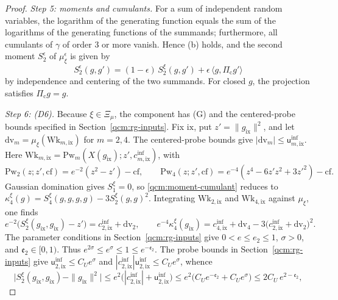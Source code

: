 \documentclass[11pt,letterpaper,reqno]{amsart}
\theoremstyle{definition}
\begin{document}
\begin{proof}
\emph{Step 5: moments and cumulants.}
For a sum of independent random variables, the logarithm of the generating function equals the sum of the logarithms of the generating functions of the summands; furthermore, all cumulants of $\gamma$ of order $3$ or more vanish.
Hence (b) holds, and the second moment $S_2^\epsilon$ of $\mu_\xi^\epsilon$ is given by
\begin{equation*}
S_2^{\epsilon}(g,g')=(1-\epsilon)\,S_2^\xi(g,g')+\epsilon\,\langle g,\Pi_{\mathrm c}g'\rangle
\end{equation*}
by independence and centering of the two summands.
For closed $g$, the projection satisfies $\Pi_{\mathrm c}g=g$.

\emph{Step 6: (D6).}
Because $\xi\in\Xi_\mu$, the component has (G) and the centered-probe bounds specified in Section~\ref{qcm:rg-inputs}.
Fix $\mathrm{ix}$, put $z'=\|g_{\mathrm{ix}}\|^2$, and let $\mathrm{dv}_m=\mu_\xi(\mathrm{Wk}_{m,\mathrm{ix}})$ for $m=2,4$. The centered-probe bounds give $|\mathrm{dv}_m|\le\mathsf u^{\mathrm{inf}}_{m,\mathrm{ix}}$.
Here $\mathrm{Wk}_{m,\mathrm{ix}}=\mathrm{Pw}_m(X(g_{\mathrm{ix}});z',c^{\mathrm{inf}}_{m,\mathrm{ix}})$, with
\begin{equation*}
\mathrm{Pw}_2(z;z',\mathrm{cf})=e^{-2}(z^2-z')-\mathrm{cf},\qquad\mathrm{Pw}_4(z;z',\mathrm{cf})=e^{-4}(z^4-6z'z^2+3z'^2)-\mathrm{cf}.
\end{equation*}
Gaussian domination gives $S_1^\xi=0$, so \eqref{qcm:moment-cumulant} reduces to $\kappa_4^\xi(g)=S_4^\xi(g,g,g,g)-3S_2^\xi(g,g)^2$.
Integrating $\mathrm{Wk}_{2,\mathrm{ix}}$ and $\mathrm{Wk}_{4,\mathrm{ix}}$ against $\mu_\xi$, one finds
\begin{equation*}
e^{-2}\bigl(S_2^\xi(g_{\mathrm{ix}},g_{\mathrm{ix}})-z'\bigr)=c^{\mathrm{inf}}_{2,\mathrm{ix}}+\mathrm{dv}_2,\qquad e^{-4}\kappa_4^\xi(g_{\mathrm{ix}})=c^{\mathrm{inf}}_{4,\mathrm{ix}}+\mathrm{dv}_4-3\bigl(c^{\mathrm{inf}}_{2,\mathrm{ix}}+\mathrm{dv}_2\bigr)^2.
\end{equation*}
The parameter conditions in Section~\ref{qcm:rg-inputs} give $0<e\le e_2\le1$, $\sigma>0$, and $\mathfrak e_2\in[0,1)$. Thus $e^{2\sigma}\le e^\sigma\le1\le e^{-\mathfrak e_2}$.
The probe bounds in Section~\ref{qcm:rg-inputs} give $\mathsf u^{\mathrm{inf}}_{2,\mathrm{ix}}\le C_Ue^\sigma$ and $|c^{\mathrm{inf}}_{2,\mathrm{ix}}|\mathsf u^{\mathrm{inf}}_{2,\mathrm{ix}}\le C_Ue^\sigma$, whence
\begin{equation*}
\bigl|S_2^\xi(g_{\mathrm{ix}},g_{\mathrm{ix}})-\|g_{\mathrm{ix}}\|^2\bigr|\le e^2\bigl(|c^{\mathrm{inf}}_{2,\mathrm{ix}}|+\mathsf u^{\mathrm{inf}}_{2,\mathrm{ix}}\bigr)\le e^2\bigl(C_Ue^{-\mathfrak e_2}+C_Ue^\sigma\bigr)\le2C_U\,e^{2-\mathfrak e_2},

\end{equation*}
\end{proof}
\end{document}
